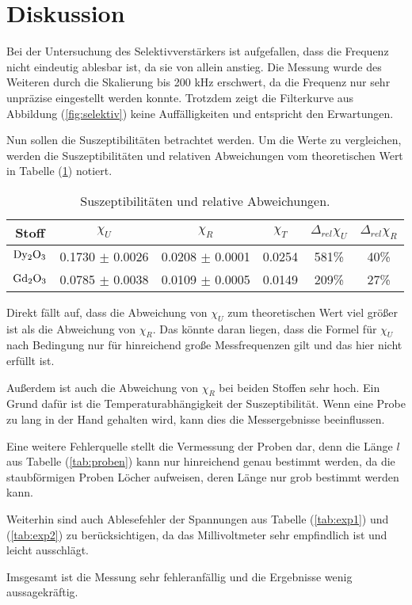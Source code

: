 \newpage
\section{Diskussion}
\label{sec:Diskussion}
\noindent
Bei der Untersuchung des Selektivverstärkers ist aufgefallen, 
dass die Frequenz nicht eindeutig ablesbar ist, da sie von allein anstieg.
Die Messung wurde des Weiteren durch die Skalierung bis 200 kHz erschwert, da die Frequenz nur sehr unpräzise eingestellt werden konnte.
Trotzdem zeigt die Filterkurve aus Abbildung (\ref{fig:selektiv}) keine Auffälligkeiten und entspricht den Erwartungen.


\noindent
Nun sollen die Suszeptibilitäten betrachtet werden.
Um die Werte zu vergleichen, werden die Suszeptibilitäten und relativen Abweichungen vom theoretischen Wert in Tabelle (\ref{tab:disk}) notiert.

\begin{table}
    \centering
    \begin{tabular}{c c c c c c}
        \toprule
        {Stoff} & {$\chi_U $} & {$\chi_R $} & {$\chi_T$} & {$\Delta_{rel}\chi_U$} & {$\Delta_{rel}\chi_R$} \\
    \midrule
    $\ce{Dy2O3}$ & 0.1730 $\pm$ 0.0026  & 0.0208 $\pm$ 0.0001 & 0.0254 & 581\% & 40\% \\
    $\ce{Gd2O3}$ & 0.0785 $\pm$ 0.0038  & 0.0109 $\pm$ 0.0005 & 0.0149 & 209\% & 27\% \\
    \bottomrule
\end{tabular}
\caption{Suszeptibilitäten und relative Abweichungen.}
\label{tab:disk}
\end{table}

\noindent
Direkt fällt auf, dass die Abweichung von $\chi_U$ zum theoretischen Wert viel größer ist als die Abweichung von $\chi_R$.
Das könnte daran liegen, dass die Formel %
für $\chi_U$ nach Bedingung nur für hinreichend große Messfrequenzen gilt und das hier nicht erfüllt ist.

\noindent
Außerdem ist auch die Abweichung von $\chi_R$ bei beiden Stoffen sehr hoch.
Ein Grund dafür ist die Temperaturabhängigkeit der Suszeptibilität.
Wenn eine Probe zu lang in der Hand gehalten wird, kann dies die Messergebnisse beeinflussen.

\noindent
Eine weitere Fehlerquelle stellt die Vermessung der Proben dar, denn die Länge $l$ aus Tabelle (\ref{tab:proben}) kann nur
hinreichend genau bestimmt werden, da die staubförmigen Proben Löcher aufweisen, deren Länge nur grob bestimmt werden kann.

\noindent
Weiterhin sind auch Ablesefehler der Spannungen aus Tabelle (\ref{tab:exp1}) und (\ref{tab:exp2}) zu berücksichtigen, da das Millivoltmeter sehr empfindlich ist und leicht ausschlägt.

\noindent
Imsgesamt ist die Messung sehr fehleranfällig und die Ergebnisse wenig aussagekräftig.


